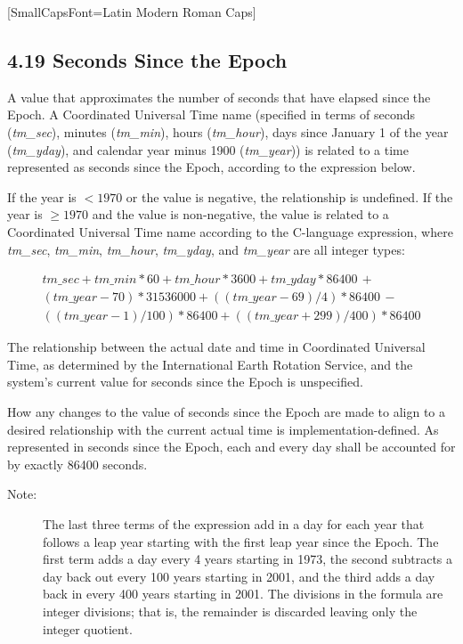 \documentclass[letterpaper,twoside]{article}
\begin{document}
{\setmainfont{Old Standard}[SmallCapsFont={Latin Modern Roman Caps}]
  \rmfamily

\subsection* {4.19 Seconds Since the Epoch}

A value that approximates the number of seconds that have elapsed since the
Epoch. A Coordinated Universal Time name (specified in terms of seconds
({\itshape tm\_sec}), minutes ({\itshape tm\_min}), hours
({\itshape tm\_hour}), days since January 1 of the
year ({\itshape tm\_yday}), and calendar year minus 1900 ({\itshape tm\_year}))
is related to a time represented as seconds since the Epoch, according to the
expression below.

If the year is $< 1970$ or the value is negative, the relationship is
undefined.
If the year is $ \geq 1970$ and the value is non-negative, the value is related
to a Coordinated Universal Time name according to the C-language expression,
where {\itshape tm\_sec}, {\itshape tm\_min}, {\itshape tm\_hour},
{\itshape tm\_yday}, and {\itshape tm\_year} are all integer types:

\begin{multline*}
  tm\_sec + tm\_min * 60 + tm\_hour * 3600 + tm\_yday * 86400 \, + \\
  (tm\_year-70) * 31536000 + ((tm\_year-69)/4) * 86400 \,- \\
  ((tm\_year-1)/100) * 86400 + ((tm\_year+299)/400) * 86400
\end{multline*}

The relationship between the actual date and time in Coordinated Universal
Time, as determined by the International Earth Rotation Service, and the
system's current value for seconds since the Epoch is unspecified.

How any changes to the value of seconds since the Epoch are made to align to
a desired relationship with the current actual time is implementation-defined.
As represented in seconds since the Epoch, each and every day shall be
accounted for by exactly \num{86400} seconds.

\begin{description}
  \item[Note:]
    The last three terms of the expression add in a day for each year that
    follows a leap year starting with the first leap year since the Epoch.
    The first term adds a day every \num{4} years starting in 1973, the second
    subtracts a day back out every \num{100} years starting in 2001,
    and the third adds a day back in every \num{400} years starting in 2001.
    The divisions in the formula are integer divisions; that is, the remainder
    is discarded leaving only the integer quotient.
\end{description}

}
\end{document}

